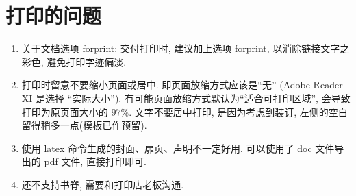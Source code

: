 \section{打印的问题}
\begin{enumerate}[label=\roman*)]
    \item  关于文档选项 forprint: 交付打印时, 建议加上选项 forprint, 以消除链接文字之彩色, 避免打印字迹偏淡.
    \item  打印时留意不要缩小页面或居中. 即页面放缩方式应该是``无'' (Adobe Reader XI 是选择 ``实际大小'').
          有可能页面放缩方式默认为``适合可打印区域'', 会导致打印为原页面大小的 $97\%$.
          文字不要居中打印, 是因为考虑到装订, 左侧的空白留得稍多一点(模板已作预留).
    \item  使用 latex 命令生成的封面、扉页、声明不一定好用, 可以使用了 doc 文件导出的 pdf 文件, 直接打印即可.
    \item  还不支持书脊, 需要和打印店老板沟通.
\end{enumerate}



